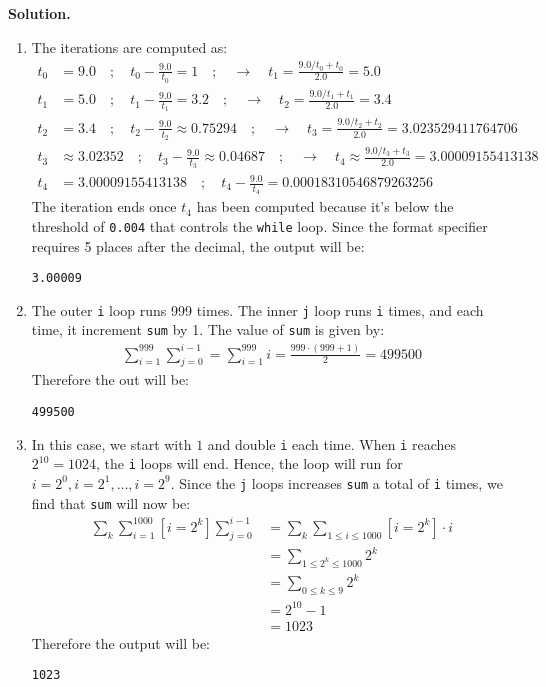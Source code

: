 \documentclass[12pt, a4paper]{article}
\newenvironment{sol}[1][Solution]
{\par\medskip\noindent \textbf{#1.} }
{\medskip}
\begin{document}
	\begin{sol}
		\
		\begin{enumerate}[label=(\alph*)]
			\item The iterations are computed as:
			\begin{align*}
				t_0 &= 9.0 \quad; \quad t_0 - \frac{9.0}{t_0} = 1 \quad ; \quad  \to \quad
				t_1 = \frac{9.0/t_0 + t_0}{2.0} = 5.0\\
				t_1 &= 5.0 \quad; \quad t_1 - \frac{9.0}{t_1} = 3.2 \quad ; \quad \to \quad
				t_2 = \frac{9.0/t_1 +t_1}{2.0} = 3.4\\
				t_2 &= 3.4 \quad; \quad t_2 - \frac{9.0}{t_2} \approx 0.75294 \quad ; \quad \to \quad
				t_3 = \frac{9.0/t_2 +t_2}{2.0} = 3.023529411764706 \\
				t_3 &\approx 3.02352 \quad; \quad t_3 - \frac{9.0}{t_3} \approx 0.04687 \quad ; \quad \to \quad
				t_4 \approx \frac{9.0/t_3 +t_3}{2.0} = 3.00009155413138 \\
				t_4 &= 3.00009155413138 \quad ; \quad t_4 - \frac{9.0}{t_4} = 0.00018310546879263256
			\end{align*}
			The iteration ends once $t_4$ has been computed because it's below the threshold
			of \texttt{0.004} that controls the \texttt{while} loop. Since the format
			specifier requires 5 places after the decimal, the output will be:
			\begin{lstlisting}[language={}]
3.00009
			\end{lstlisting}
			\item The outer \texttt{i} loop runs 999 times. The inner \texttt{j} loop
			runs \texttt{i} times, and each time, it increment \texttt{sum} by 1.
			The value of \texttt{sum} is given by:
			\begin{align*}
				\sum_{i = 1}^{999} \sum_{j = 0}^{i - 1} =
				\sum_{i = 1}^{999} i =
				\frac{999 \cdot (999 + 1)}{2} =
				499500
			\end{align*}
			Therefore the out will be:
			\begin{lstlisting}
499500
			\end{lstlisting}
			\item In this case, we start with $1$ and double \texttt{i} each  time.
			When \texttt{i} reaches $2^{10} =1024$, the \texttt{i} loops will end.
			Hence, the loop will run for $i=2^0, i=2^1,\ldots,i=2^{9}$. Since the
			\texttt{j} loops increases \texttt{sum} a total of \texttt{i} times,
			we find that \texttt{sum} will now be:
			\begin{align*}
				\sum_{k}\sum_{i = 1}^{1000}[i = 2^k] \sum_{j=0}^{i-1}
				&= \sum_{k}\sum_{1\leq i\leq 1000}[i = 2^k]\cdot i\\
				&=\sum_{1\leq 2^k\leq 1000}2^k\\
				&=\sum_{0\leq k\leq 9}2^k\\
				&=2^{10} - 1\\
				&=1023
			\end{align*}
			Therefore the output will be:
			\begin{lstlisting}
1023
			\end{lstlisting}
		\end{enumerate}
	\end{sol}
\end{document}
